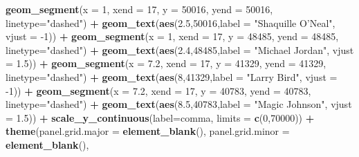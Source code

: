 \documentclass[]{book}
\newenvironment{Shaded}{\begin{snugshade}}{\end{snugshade}}
\newcommand{\DataTypeTok}[1]{\textcolor[rgb]{0.13,0.29,0.53}{#1}}
\newcommand{\DecValTok}[1]{\textcolor[rgb]{0.00,0.00,0.81}{#1}}
\newcommand{\FloatTok}[1]{\textcolor[rgb]{0.00,0.00,0.81}{#1}}
\newcommand{\KeywordTok}[1]{\textcolor[rgb]{0.13,0.29,0.53}{\textbf{#1}}}
\newcommand{\NormalTok}[1]{#1}
\newcommand{\OperatorTok}[1]{\textcolor[rgb]{0.81,0.36,0.00}{\textbf{#1}}}
\newcommand{\StringTok}[1]{\textcolor[rgb]{0.31,0.60,0.02}{#1}}
\begin{document}
\begin{Shaded}
\begin{Highlighting}[]
\StringTok{  }\KeywordTok{geom_segment}\NormalTok{(}\DataTypeTok{x =} \DecValTok{1}\NormalTok{, }\DataTypeTok{xend =} \DecValTok{17}\NormalTok{, }\DataTypeTok{y =} \DecValTok{50016}\NormalTok{, }\DataTypeTok{yend =} \DecValTok{50016}\NormalTok{, }\DataTypeTok{linetype=}\StringTok{"dashed"}\NormalTok{) }\OperatorTok{+}\StringTok{ }\KeywordTok{geom_text}\NormalTok{(}\KeywordTok{aes}\NormalTok{(}\FloatTok{2.5}\NormalTok{,}\DecValTok{50016}\NormalTok{,}\DataTypeTok{label =} \StringTok{"Shaquille O'Neal"}\NormalTok{, }\DataTypeTok{vjust =} \DecValTok{-1}\NormalTok{)) }\OperatorTok{+}
\StringTok{  }\KeywordTok{geom_segment}\NormalTok{(}\DataTypeTok{x =} \DecValTok{1}\NormalTok{, }\DataTypeTok{xend =} \DecValTok{17}\NormalTok{, }\DataTypeTok{y =} \DecValTok{48485}\NormalTok{, }\DataTypeTok{yend =} \DecValTok{48485}\NormalTok{, }\DataTypeTok{linetype=}\StringTok{"dashed"}\NormalTok{) }\OperatorTok{+}\StringTok{ }\KeywordTok{geom_text}\NormalTok{(}\KeywordTok{aes}\NormalTok{(}\FloatTok{2.4}\NormalTok{,}\DecValTok{48485}\NormalTok{,}\DataTypeTok{label =} \StringTok{"Michael Jordan"}\NormalTok{, }\DataTypeTok{vjust =} \FloatTok{1.5}\NormalTok{)) }\OperatorTok{+}
\StringTok{  }\KeywordTok{geom_segment}\NormalTok{(}\DataTypeTok{x =} \FloatTok{7.2}\NormalTok{, }\DataTypeTok{xend =} \DecValTok{17}\NormalTok{, }\DataTypeTok{y =} \DecValTok{41329}\NormalTok{, }\DataTypeTok{yend =} \DecValTok{41329}\NormalTok{, }\DataTypeTok{linetype=}\StringTok{"dashed"}\NormalTok{) }\OperatorTok{+}\StringTok{ }\KeywordTok{geom_text}\NormalTok{(}\KeywordTok{aes}\NormalTok{(}\DecValTok{8}\NormalTok{,}\DecValTok{41329}\NormalTok{,}\DataTypeTok{label =} \StringTok{"Larry Bird"}\NormalTok{, }\DataTypeTok{vjust =} \DecValTok{-1}\NormalTok{)) }\OperatorTok{+}
\StringTok{   }\KeywordTok{geom_segment}\NormalTok{(}\DataTypeTok{x =} \FloatTok{7.2}\NormalTok{, }\DataTypeTok{xend =} \DecValTok{17}\NormalTok{, }\DataTypeTok{y =} \DecValTok{40783}\NormalTok{, }\DataTypeTok{yend =} \DecValTok{40783}\NormalTok{, }\DataTypeTok{linetype=}\StringTok{"dashed"}\NormalTok{) }\OperatorTok{+}\StringTok{ }\KeywordTok{geom_text}\NormalTok{(}\KeywordTok{aes}\NormalTok{(}\FloatTok{8.5}\NormalTok{,}\DecValTok{40783}\NormalTok{,}\DataTypeTok{label =} \StringTok{"Magic Johnson"}\NormalTok{, }\DataTypeTok{vjust =} \FloatTok{1.5}\NormalTok{)) }\OperatorTok{+}
\StringTok{  }\KeywordTok{scale_y_continuous}\NormalTok{(}\DataTypeTok{label=}\NormalTok{comma, }\DataTypeTok{limits =} \KeywordTok{c}\NormalTok{(}\DecValTok{0}\NormalTok{,}\DecValTok{70000}\NormalTok{)) }\OperatorTok{+}\StringTok{ }
\StringTok{  }\KeywordTok{theme}\NormalTok{(}\DataTypeTok{panel.grid.major =} \KeywordTok{element_blank}\NormalTok{(), }\DataTypeTok{panel.grid.minor =} \KeywordTok{element_blank}\NormalTok{(), }

\end{Highlighting}
\end{Shaded}
\end{document}
